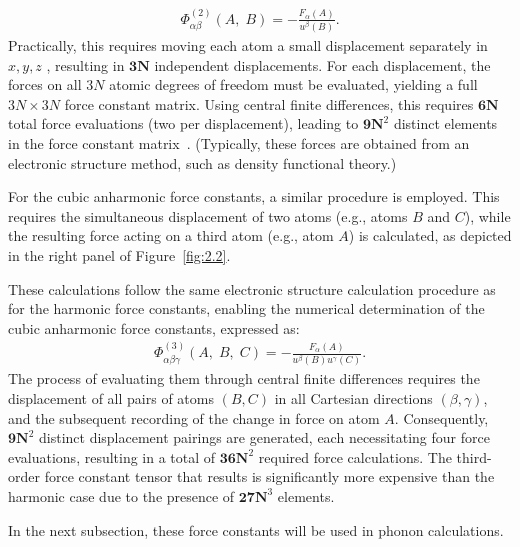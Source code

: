 \begin{equation}
\label{equ:2.5}
\begin{split}
        \Phi^{(2)}_{\alpha\beta}(A,\;B) = -\frac{F_{\alpha}(A)}{u^\beta(B)}.
\end{split}
\end{equation}
Practically, this requires moving each atom a small displacement separately in $x, y, z$ , resulting in $\textbf{3N}$ independent displacements. For each displacement, the forces on all $3N$ atomic degrees of freedom must be evaluated, yielding a full $3N \times 3N$ force constant matrix. Using central finite differences, this requires $\textbf{6N}$ total force evaluations (two per displacement), leading to $\textbf{9N}^2$ distinct elements in the force constant matrix~\cite{kittel2005}. (Typically, these forces are obtained from an electronic structure method, such as density functional theory.)

For the cubic anharmonic force constants, a similar procedure is employed. This requires the simultaneous displacement of two atoms (e.g., atoms $B$ and $C$), while the resulting force acting on a third atom (e.g., atom $A$) is calculated, as depicted in the right panel of Figure~\ref{fig:2.2}. 

These calculations follow the same electronic structure calculation procedure as for the harmonic force constants, enabling the numerical determination of the cubic anharmonic force constants, expressed as:
\begin{equation}
\label{equ:2.6}
\begin{split}
        \Phi^{(3)}_{\alpha\beta\gamma}(A,\;B,\;C) = -\frac{F_\alpha(A)}{u^\beta(B)u^\gamma(C)}.
\end{split}
\end{equation}
The process of evaluating them through central finite differences requires the displacement of all pairs of atoms \( (B, C) \) in all Cartesian directions \( (\beta, \gamma) \), and the subsequent recording of the change in force on atom \( A \). Consequently, \( \textbf{9N}^2 \) distinct displacement pairings are generated, each necessitating four force evaluations, resulting in a total of \( \textbf{36N}^2 \) required force calculations. The third-order force constant tensor that results is significantly more expensive than the harmonic case due to the presence of \( \textbf{27N}^3 \) elements.

In the next subsection, these force constants will be used in phonon calculations.

